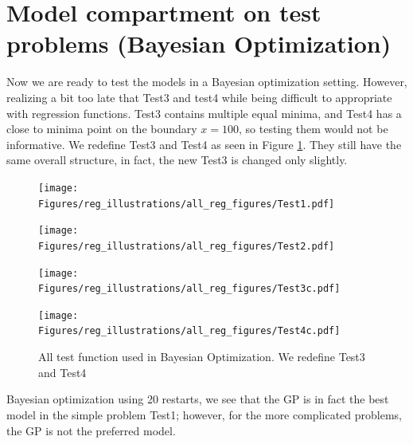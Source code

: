 \section{Model compartment on test problems (Bayesian Optimization)}
Now we are ready to test the models in a Bayesian optimization setting. However, realizing a bit too
late that Test3 and test4 while being difficult to appropriate with regression functions. Test3
contains multiple equal minima, and Test4 has a close to minima point on the boundary $x=100$, so
testing them would not be informative. We redefine Test3 and Test4 as seen in Figure
\ref{TEST_problems2}. They still have the same overall structure, in fact, the new Test3 is changed only
slightly.

\begin{figure}[h]
  \centering
  \begin{minipage}[b]{0.24\textwidth}
   \texttt{[image: Figures/reg\_illustrations/all\_reg\_figures/Test1.pdf]}
  \end{minipage}
  \hfill
  \begin{minipage}[b]{0.24\textwidth}
    \texttt{[image: Figures/reg\_illustrations/all\_reg\_figures/Test2.pdf]}
   \end{minipage}
   \hfill
   \begin{minipage}[b]{0.24\textwidth}
    \texttt{[image: Figures/reg\_illustrations/all\_reg\_figures/Test3c.pdf]}
   \end{minipage}
   \hfill
   \begin{minipage}[b]{0.24\textwidth}
     \texttt{[image: Figures/reg\_illustrations/all\_reg\_figures/Test4c.pdf]}
    \end{minipage}
  \caption{All test function used in Bayesian Optimization. We redefine Test3 and Test4}
  \label{TEST_problems2}
\end{figure}


Bayesian optimization using 20 restarts, we see that the GP is in fact the best model in the simple
problem Test1; however, for the more complicated problems, the GP is not the preferred model.

